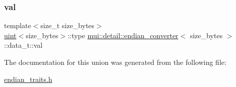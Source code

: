 \mbox{\label{unionmui_1_1detail_1_1endian__converter_1_1data__t_a417cac59882efbad398883100aa83b42}} 
\subsubsection{\texorpdfstring{val}{val}}
{\footnotesize\ttfamily template$<$size\+\_\+t size\+\_\+bytes$>$ \\
\hyperlink{structmui_1_1detail_1_1uint}{uint}$<$size\+\_\+bytes$>$\+::type \hyperlink{structmui_1_1detail_1_1endian__converter}{mui\+::detail\+::endian\+\_\+converter}$<$ size\+\_\+bytes $>$\+::data\+\_\+t\+::val}



The documentation for this union was generated from the following file\+:\begin{DoxyCompactItemize}
\item 
\hyperlink{endian__traits_8h}{endian\+\_\+traits.\+h}\end{DoxyCompactItemize}
